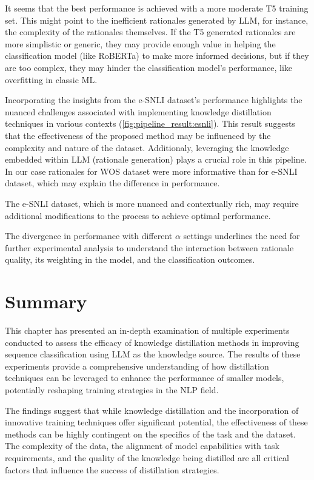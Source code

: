 It seems that the best performance is achieved with a more moderate T5 training set. This might point to the inefficient rationales generated by LLM, for instance, the complexity of the rationales themselves. If the T5 generated rationales are more simplistic or generic, they may provide enough value in helping the classification model (like RoBERTa) to make more informed decisions, but if they are too complex, they may hinder the classification model's performance, like overfitting in classic ML\@.

Incorporating the insights from the e-SNLI dataset's performance highlights the nuanced challenges associated with implementing knowledge distillation techniques in various contexts (\autoref{fig:pipeline_result:esnli}). This result suggests that the effectiveness of the proposed method may be influenced by the complexity and nature of the dataset. Additionaly, leveraging the knowledge embedded within LLM (rationale generation) plays a crucial role in this pipeline. In our case rationales for WOS dataset were more informative than for e-SNLI dataset, which may explain the difference in performance.

The e-SNLI dataset, which is more nuanced and contextually rich, may require additional modifications to the process to achieve optimal performance.

The divergence in performance with different $\alpha$ settings underlines the need for further experimental analysis to understand the interaction between rationale quality, its weighting in the model, and the classification outcomes.

\section{Summary}

This chapter has presented an in-depth examination of multiple experiments conducted to assess the efficacy of knowledge distillation methods in improving sequence classification using LLM as the knowledge source. The results of these experiments provide a comprehensive understanding of how distillation techniques can be leveraged to enhance the performance of smaller models, potentially reshaping training strategies in the NLP field.

The findings suggest that while knowledge distillation and the incorporation of innovative training techniques offer significant potential, the effectiveness of these methods can be highly contingent on the specifics of the task and the dataset. The complexity of the data, the alignment of model capabilities with task requirements, and the quality of the knowledge being distilled are all critical factors that influence the success of distillation strategies.
